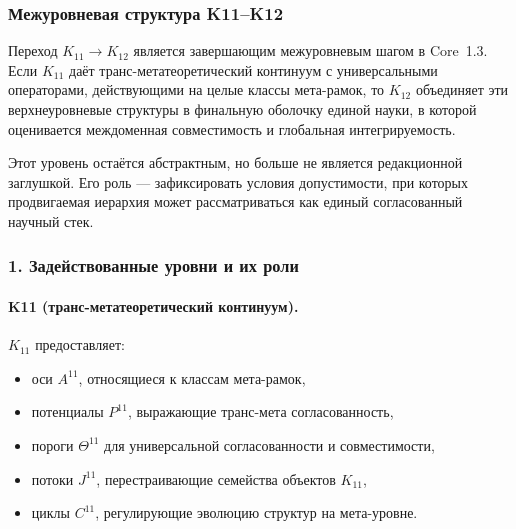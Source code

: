
\subsubsection{Межуровневая структура K11–K12}
\label{sec:crossk-k11-k12}

Переход $K_{11} \rightarrow K_{12}$ является завершающим межуровневым шагом
в Core~1.3. Если $K_{11}$ даёт транс-метатеоретический континуум с
универсальными операторами, действующими на целые классы мета-рамок, то $K_{12}$
объединяет эти верхнеуровневые структуры в финальную оболочку единой науки,
в которой оценивается междоменная совместимость и глобальная интегрируемость.

Этот уровень остаётся абстрактным, но больше не является редакционной заглушкой.
Его роль — зафиксировать условия допустимости, при которых продвигаемая
иерархия может рассматриваться как единый согласованный научный стек.

\subsubsection{1. Задействованные уровни и их роли}

\paragraph{K11 (транс-метатеоретический континуум).}
$K_{11}$ предоставляет:
\begin{itemize}
  \item оси $A^{11}$, относящиеся к классам мета-рамок,
  \item потенциалы $P^{11}$, выражающие транс-мета согласованность,
  \item пороги $\Theta^{11}$ для универсальной согласованности и совместимости,
  \item потоки $J^{11}$, перестраивающие семейства объектов $K_{11}$,
  \item циклы $C^{11}$, регулирующие эволюцию структур на мета-уровне.
\end{itemize}

